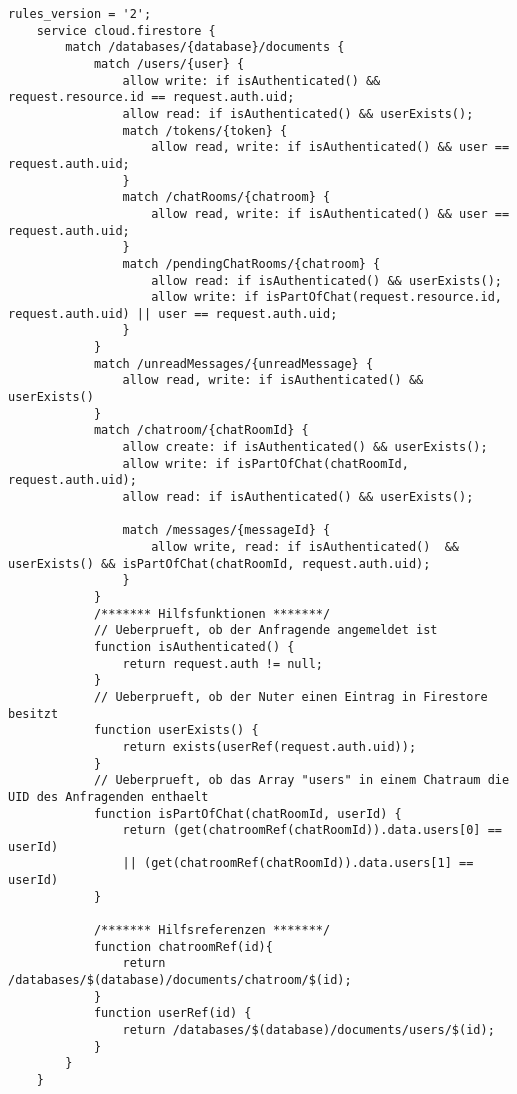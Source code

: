\begin{lstlisting}[caption=Sicherheitsregeln Firestore, label=lst:appendix_firestore_rules]
	rules_version = '2';
	service cloud.firestore {
		match /databases/{database}/documents {
			match /users/{user} {
				allow write: if isAuthenticated() && request.resource.id == request.auth.uid;
				allow read: if isAuthenticated() && userExists();
				match /tokens/{token} {
					allow read, write: if isAuthenticated() && user == request.auth.uid;
				}
				match /chatRooms/{chatroom} {
					allow read, write: if isAuthenticated() && user == request.auth.uid;
				}
				match /pendingChatRooms/{chatroom} {
					allow read: if isAuthenticated() && userExists();
					allow write: if isPartOfChat(request.resource.id, request.auth.uid) || user == request.auth.uid;
				}
			}
			match /unreadMessages/{unreadMessage} {
				allow read, write: if isAuthenticated() && userExists()
			}
			match /chatroom/{chatRoomId} {
				allow create: if isAuthenticated() && userExists();
				allow write: if isPartOfChat(chatRoomId, request.auth.uid);
				allow read: if isAuthenticated() && userExists();
				
				match /messages/{messageId} {
					allow write, read: if isAuthenticated()  && userExists() && isPartOfChat(chatRoomId, request.auth.uid);
				}
			}    
			/******* Hilfsfunktionen *******/
			// Ueberprueft, ob der Anfragende angemeldet ist
			function isAuthenticated() {
				return request.auth != null;
			}
			// Ueberprueft, ob der Nuter einen Eintrag in Firestore besitzt
			function userExists() {
				return exists(userRef(request.auth.uid));
			}
			// Ueberprueft, ob das Array "users" in einem Chatraum die UID des Anfragenden enthaelt
			function isPartOfChat(chatRoomId, userId) {
				return (get(chatroomRef(chatRoomId)).data.users[0] == userId)
				|| (get(chatroomRef(chatRoomId)).data.users[1] == userId)
			}
		
			/******* Hilfsreferenzen *******/
			function chatroomRef(id){
				return /databases/$(database)/documents/chatroom/$(id);
			}
			function userRef(id) {
				return /databases/$(database)/documents/users/$(id);
			}
		}
	}
\end{lstlisting}